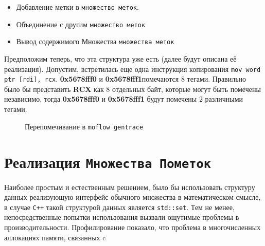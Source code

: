 \begin{itemize}
    \item Добавление метки в \texttt{множество меток}.
    \item Объединение с другим \texttt{множество меток}
    \item Вывод содержимого Множества \texttt{множества меток}
\end{itemize}

Предположим теперь, что эта структура уже есть (далее будут описана её реализация). Допустим, встретилась еще одна инструкция копирования \texttt{mov word ptr [rdi], rcx}. \textbf{0x5678fff0} и \textbf{0x5678fff1}помечаются $8$ тегами. Правильно было бы представить \textbf{RCX} как 8 отдельных байт, которые могут быть помечены независимо, тогда \textbf{0x5678fff0} и \textbf{0x5678fff1} будут помечены $2$ различными тегами.

\begin{figure}[H]
    \caption{Перепомечивание в \texttt{moflow gentrace}}
    \label{fig:moflow3}
\end{figure}

\section{Реализация \texttt{Множества Пометок}}

Наиболее простым и естественным решением, было бы использовать структуру данных реализующую интерфейс обычного множества в математическом смысле, в случае \texttt{C++} такой структурой данных является \texttt{std::set}. Тем не менее, непосредственные попытки использования вызвали ощутимые проблемы в производительности. Профилирование показало, что проблема в многочисленных аллокациях памяти, связанных c


